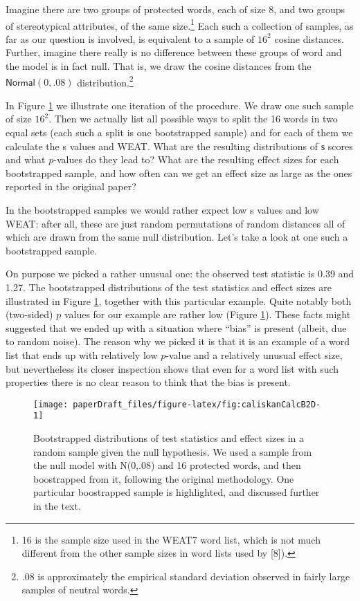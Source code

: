 \documentclass[
  12pt,
  dvipsnames,enabledeprecatedfontcommands]{scrartcl}
\begin{document}
Imagine there are two groups of protected words, each of size 8, and two
groups of stereotypical attributes, of the same size.\footnote{16 is the
  sample size used in the WEAT7 word list, which is not much different
  from the other sample sizes in word lists used by {[}8{]}).} Each such
a collection of samples, as far as our question is involved, is
equivalent to a sample of \(16^2\) cosine distances. Further, imagine
there really is no difference between these groups of word and the model
is in fact null. That is, we draw the cosine distances from the
\(\mathsf{Normal}(0,.08)\) distribution.\footnote{\(.08\) is
  approximately the empirical standard deviation observed in fairly
  large samples of neutral words.}

In Figure \ref{fig:caliskanCalc} we illustrate one iteration of the
procedure. We draw one such sample of size \(16^2\). Then we actually
list all possible ways to split the 16 words in two equal sets (each
such a split is one bootstrapped sample) and for each of them we
calculate the \textsf{s} values and \textsf{WEAT}. What are the
resulting distributions of \(\textsf{s}\) scores and what \(p\)-values
do they lead to? What are the resulting effect sizes for each
bootstrapped sample, and how often can we get an effect size as large as
the ones reported in the original paper?

In the bootstrapped samples we would rather expect low \textsf{s} values
and low \textsf{WEAT}: after all, these are just random permutations of
random distances all of which are drawn from the same null distribution.
Let's take a look at one such a bootstrapped sample.

On purpose we picked a rather unusual one: the observed test statistic
is 0.39 and 1.27. The bootstrapped distributions of the test statistics
and effect sizes are illustrated in Figure \ref{fig:caliskanCalc},
together with this particular example. Quite notably both (two-sided)
\(p\) values for our example are rather low (Figure
\ref{fig:caliskanCalc}). These facts might suggested that we ended up
with a situation where ``bias'' is present (albeit, due to random
noise). The reason why we picked it is that it is an example of a word
list that ends up with relatively low \(p\)-value and a relatively
unusual effect size, but nevertheless its closer inspection shows that
even for a word list with such properties there is no clear reason to
think that the bias is present.

\begin{figure}[H]

\begin{center}\texttt{[image: paperDraft\_files/figure-latex/fig:caliskanCalcB2D-1]} \end{center}

\caption{Bootstrapped distributions of test statistics and effect sizes in a random sample given the null hypothesis. We used a sample from the null  model with N(0,.08) and 16 protected words, and then boostrapped from it, following the original methodology. One particular boostrapped sample is highlighted, and discussed further in the text. }
\label{fig:caliskanCalc}
\end{figure}
\end{document}
